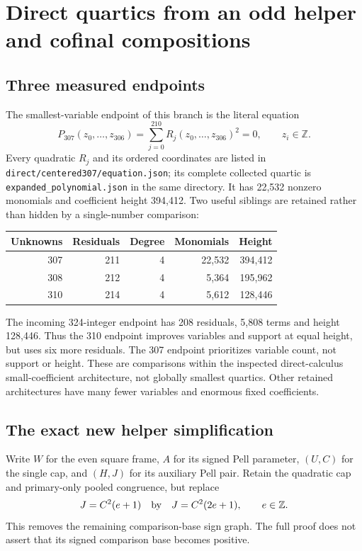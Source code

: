 \documentclass[11pt]{article}
\begin{document}
\section{Direct quartics from an odd helper and cofinal compositions}
\label{sec:round17-direct}

\subsection{Three measured endpoints}
The smallest-variable endpoint of this branch is the literal equation
\[
 P_{307}(z_0,\ldots,z_{306})
   =\sum_{j=0}^{210}R_j(z_0,\ldots,z_{306})^2=0,
 \qquad z_i\in\mathbb Z.
\]
Every quadratic $R_j$ and its ordered coordinates are listed in
\texttt{direct/centered307/equation.json}; its complete collected quartic is
\texttt{expanded\_polynomial.json} in the same directory. It has 22,532
nonzero monomials and coefficient height 394,412. Two useful siblings are
retained rather than hidden by a single-number comparison:
\begin{center}
\begin{tabular}{rrrrr}
\toprule
Unknowns & Residuals & Degree & Monomials & Height\\
\midrule
307 & 211 & 4 & 22,532 & 394,412\\
308 & 212 & 4 & 5,364 & 195,962\\
310 & 214 & 4 & 5,612 & 128,446\\
\bottomrule
\end{tabular}
\end{center}
The incoming 324-integer endpoint has 208 residuals, 5,808 terms and height
128,446. Thus the 310 endpoint improves variables and support at equal height,
but uses six more residuals. The 307 endpoint prioritizes variable count, not
support or height. These are comparisons within the inspected direct-calculus
small-coefficient architecture, not globally smallest quartics. Other retained
architectures have many fewer variables and enormous fixed coefficients.

\subsection{The exact new helper simplification}
Write $W$ for the even square frame, $A$ for its signed Pell parameter,
$(U,C)$ for the single cap, and $(H,J)$ for its auxiliary Pell pair. Retain
the quadratic cap and primary-only pooled congruence, but replace
\[
 J=C^2(e+1)\quad\hbox{by}\quad J=C^2(2e+1),\qquad e\in\mathbb Z.
\]
This removes the remaining comparison-base sign graph. The full proof does
not assert that its signed comparison base becomes positive.
\end{document}
